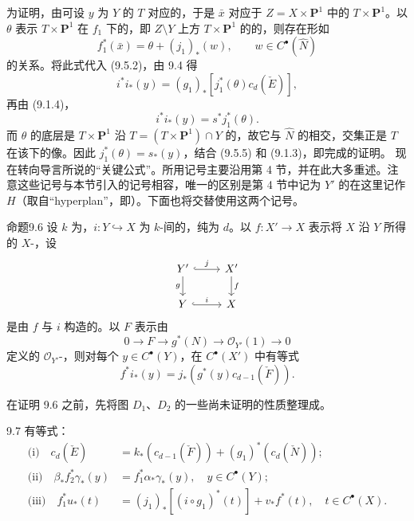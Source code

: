 为证明，由可设 $y$ 为 $Y$ 的 $T$ 对应的，于是 $\bar x$ 对应于 $Z=X\times\mathbf P^1$ 中的 $T\times\mathbf P^1$。以 $\theta$ 表示 $T\times\mathbf P^1$ 在 $f_1$ 下的，即 $Z\setminus Y$ 上方 $T\times\mathbf P^1$ 的的，则存在形如
\[
 f_1^*(\bar x)=\theta+(j_1)_*(w),\qquad w\in C^\bullet(\widehat N)\tag{9.5.3}
\]
的关系。将此式代入 (9.5.2)，由 9.4 得
\[
 i^*i_*(y)=(g_1)_*[j_1^*(\theta)c_d(\check E)],\tag{9.5.4}
\]
再由 (9.1.4)，
\[
 i^*i_*(y)=s^*j_1^*(\theta).\tag{9.5.5}
\]
而 $\theta$ 的底层是 $T\times\mathbf P^1$ 沿 $T=(T\times\mathbf P^1)\cap Y$ 的，故它与 $\widehat N$ 的相交，交集正是 $T$ 在该下的像。因此 $j_1^*(\theta)=s_*(y)$，结合 (9.5.5) 和 (9.1.3)，即完成的证明。
现在转向导言所说的“关键公式”。所用记号主要沿用第 4 节，并在此大多重述。注意这些记号与本节引入的记号相容，唯一的区别是第 4 节中记为 $Y'$ 的在这里记作 $H$（取自“hyperplan”，即）。下面也将交替使用这两个记号。
\begin{SGAresult}{命题}{9.6}
设 $k$ 为，$i:Y\hookrightarrow X$ 为 $k$-间的，纯为 $d$。以 $f:X'\to X$ 表示将 $X$ 沿 $Y$ 所得的 $X$-，设
\[
\begin{tikzcd}
Y'\arrow[r,hook,"j"]\arrow[d,"g"']&X'\arrow[d,"f"]\\
Y\arrow[r,hook,"i"]&X
\end{tikzcd}
\]
是由 $f$ 与 $i$ 构造的。以 $F$ 表示由
\[
 0\longrightarrow F\longrightarrow g^*(N)\longrightarrow\mathscr O_{Y'}(1)\longrightarrow0
 \tag{9.6.1}
\]
定义的 $\mathscr O_{Y'}$-，则对每个 $y\in C^\bullet(Y)$，在 $C^\bullet(X')$ 中有等式
\[
 f^*i_*(y)=j_*(g^*(y)c_{d-1}(\check F)).\tag{9.6.2}
\]
\end{SGAresult}
在证明 9.6 之前，先将图 $D_1$、$D_2$ 的一些尚未证明的性质整理成。
\begin{SGAresult}{}{9.7}
有等式：
\[
\begin{aligned}
\text{(i)}\quad c_d(\check E)&=k_*(c_{d-1}(\check F))+(g_1)^*(c_d(\check N));\\
\text{(ii)}\quad\beta_*f_2^*\gamma_*(y)&=f_1^*\alpha_*\gamma_*(y),\quad y\in C^\bullet(Y);\\
\text{(iii)}\quad f_1^*u_*(t)&=(j_1)_*[(i\circ g_1)^*(t)]+v_*f^*(t),\quad t\in C^\bullet(X).
\end{aligned}
\]
\end{SGAresult}
